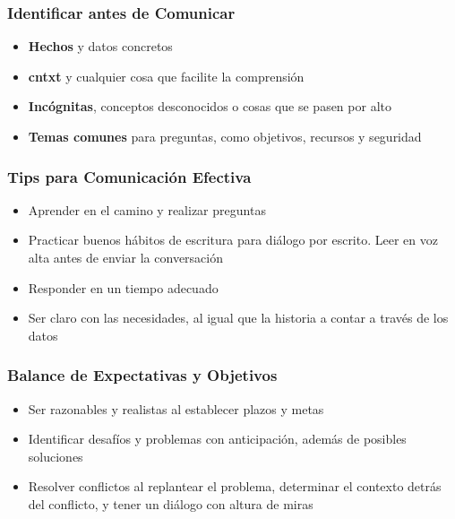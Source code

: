 \subsubsection{Identificar antes de Comunicar}
\begin{itemize}
    \item {\textbf{Hechos} y datos concretos}
    \item {\textbf{\gls{cntxt}} y cualquier cosa que facilite la comprensión}
    \item {\textbf{Incógnitas}, conceptos desconocidos o cosas que se pasen por alto}
    \item {\textbf{Temas comunes} para preguntas, como objetivos, recursos y seguridad}
\end{itemize}

\subsubsection{Tips para Comunicación Efectiva}
\begin{itemize}
    \item {Aprender en el camino y realizar preguntas}
    \item {Practicar buenos hábitos de escritura para diálogo por escrito. Leer en voz alta antes de enviar la conversación}
    \item {Responder en un tiempo adecuado}
    \item {Ser claro con las necesidades, al igual que la historia a contar a través de los datos}
\end{itemize}

\subsubsection{Balance de Expectativas y Objetivos}
\begin{itemize}
    \item {Ser razonables y realistas al establecer plazos y metas}
    \item {Identificar desafíos y problemas con anticipación, además de posibles soluciones}
    \item {Resolver conflictos al replantear el problema, determinar el contexto detrás del conflicto, y tener un diálogo con altura de miras}
\end{itemize}

